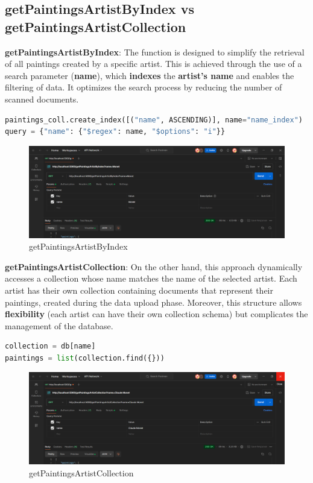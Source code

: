 \documentclass[a4paper,12pt]{article}
\begin{document}
\subsection{getPaintingsArtistByIndex vs getPaintingsArtistCollection}
\textbf{getPaintingsArtistByIndex}: The function is designed to simplify the retrieval of all paintings created by a specific artist. This is achieved through the use of a search parameter (\textbf{name}), which \textbf{indexes} the \textbf{artist's name} and enables the filtering of data. It optimizes the search process by reducing the number of scanned documents.
\begin{lstlisting}[language=Python]
paintings_coll.create_index([("name", ASCENDING)], name="name_index")
query = {"name": {"$regex": name, "$options": "i"}}
\end{lstlisting}
\begin{figure}[h]
      \centering
      \includegraphics[width=1\textwidth]{images/getPaintingsArtistByIndexS.png}
      \caption{getPaintingsArtistByIndex}
\end{figure}

\textbf{getPaintingsArtistCollection}: On the other hand, this approach dynamically accesses a collection whose name matches the name of the selected artist. Each artist has their own collection containing documents that represent their paintings, created during the data upload phase. Moreover, this structure allows \textbf{flexibility} (each artist can have their own collection schema) but complicates the management of the database.
\begin{lstlisting}[language=Python]
collection = db[name]
paintings = list(collection.find({}))
\end{lstlisting}

\begin{figure}[h]
      \centering
      \includegraphics[width=1\textwidth]{images/getPaintingsArtistCollectionS.png}
      \caption{getPaintingsArtistCollection}
\end{figure}
\end{document}
